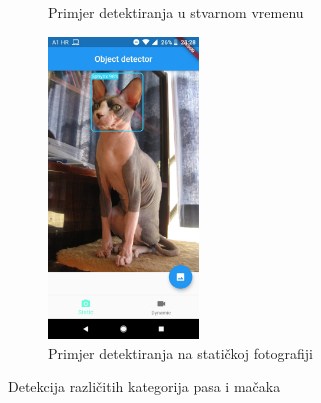 \begin{figure}[htb]
\begin{subfigure}{.3\textwidth}
        \caption{Primjer detektiranja u stvarnom vremenu}
        \label{App-beagle}
    \end{subfigure}
    \begin{subfigure}{.3\textwidth}
        \centering
        \includegraphics[height=8cm]{img/app-test-spinx.jpeg}
        \caption{Primjer detektiranja na statičkoj fotografiji}
        \label{App-spinx}
    \end{subfigure}
\caption{Detekcija različitih kategorija pasa i mačaka}
\label{fig:CAT_Eval}
\end{figure}
